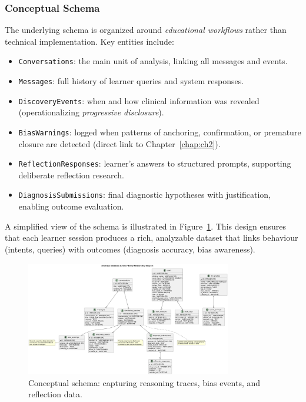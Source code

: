 \subsubsection{Conceptual Schema}

The underlying schema is organized around \emph{educational workflows} rather than
technical implementation. Key entities include:

\begin{itemize}
    \item \texttt{Conversations}: the main unit of analysis, linking all messages and events.
    \item \texttt{Messages}: full history of learner queries and system responses.
    \item \texttt{DiscoveryEvents}: when and how clinical information was revealed
    (operationalizing \emph{progressive disclosure}).
    \item \texttt{BiasWarnings}: logged when patterns of anchoring, confirmation,
    or premature closure are detected (direct link to Chapter~\ref{chap:ch2}).
    \item \texttt{ReflectionResponses}: learner’s answers to structured prompts,
    supporting deliberate reflection research.
    \item \texttt{DiagnosisSubmissions}: final diagnostic hypotheses with
    justification, enabling outcome evaluation.
\end{itemize}

A simplified view of the schema is illustrated in
Figure~\ref{fig:db_schema}. This design ensures that each learner
session produces a rich, analyzable dataset that links behaviour
(intents, queries) with outcomes (diagnosis accuracy, bias awareness).

\begin{figure}[h]
    \centering
    \includegraphics[width=0.8\textwidth]{figures/diagrams/erdb.png}
    \caption{Conceptual schema: capturing reasoning traces, bias events, and reflection data.}
    \label{fig:db_schema}
\end{figure}

